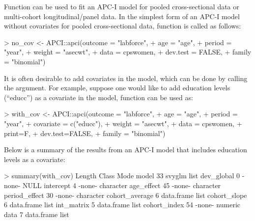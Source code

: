 Function {} can be used to fit an APC-I model for pooled cross-sectional data or multi-cohort longitudinal/panel data. In the simplest form of an APC-I model without covariates for pooled cross-sectional data, function {} is called as follows:

\begin{example}
> no_cov <- APCI::apci(outcome = "labforce", 
+                      age = "age", 
+                      period = "year", 
+                      weight = "asecwt",
+                      data = cpswomen, 
+                      dev.test = FALSE, 
+                      family = "binomial")
\end{example}

It is often desirable to add covariates in the model, which can be done by calling the {} argument.  For example, suppose one would like to add education levels (``educc'') as a covariate in the model, function {} can be used as:

\begin{example}
> with_cov <- APCI::apci(outcome = "labforce",
+                        age = "age",
+                        period = "year",
+                        covariate = c("educc"),
+                        weight = "asecwt",
+                        data = cpswomen, 
+                        print=F,
+                        dev.test=FALSE, 
+                        family = "binomial")
\end{example}

Below is a summary of the results from an APC-I model that includes education levels as a covariate:

\begin{example}
> summary(with_cov)
               Length Class      Mode     
model          33     svyglm     list     
dev_global      0     -none-     NULL     
intercept       4     -none-     character
age_effect     45     -none-     character
period_effect  30     -none-     character
cohort_average  6     data.frame list     
cohort_slope    6     data.frame list     
int_matrix      5     data.frame list     
cohort_index   54     -none-     numeric  
data            7     data.frame list   
\end{example}

